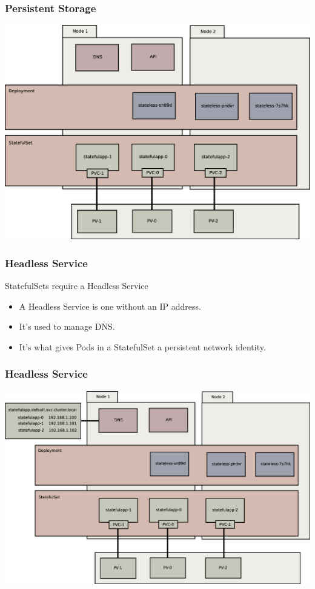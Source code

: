 \documentclass{beamer}
\begin{document}
\begin{frame}
    \frametitle{Persistent Storage}
    \includegraphics[width=\textwidth,height=0.85\textheight,keepaspectratio]{graphics/06-persistence.eps}
\end{frame}

\begin{frame}
    \frametitle{Headless Service}
    StatefulSets require a Headless Service
    \begin{itemize}
        \item A Headless Service is one without an IP address.
        \item It's used to manage DNS.
        \item It's what gives Pods in a StatefulSet a persistent network identity.
    \end{itemize}
\end{frame}

\begin{frame}
    \frametitle{Headless Service}
    \includegraphics[width=\textwidth,height=0.85\textheight,keepaspectratio]{graphics/07-persistentIdentity.eps}
\end{frame}
\end{document}

